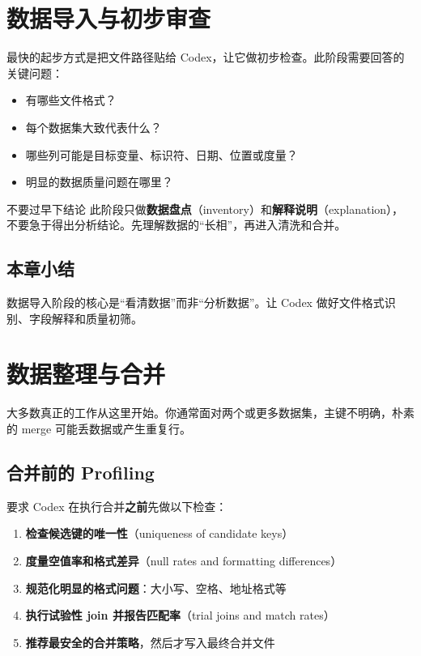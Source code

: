 \documentclass[a4paper]{article}
\begin{document}
\section{数据导入与初步审查}

最快的起步方式是把文件路径贴给 Codex，让它做初步检查。此阶段需要回答的关键问题：

\begin{itemize}[nosep]
    \item 有哪些文件格式？
    \item 每个数据集大致代表什么？
    \item 哪些列可能是目标变量、标识符、日期、位置或度量？
    \item 明显的数据质量问题在哪里？
\end{itemize}

\begin{warningbox}{不要过早下结论}
此阶段只做\textbf{数据盘点}（inventory）和\textbf{解释说明}（explanation），不要急于得出分析结论。先理解数据的``长相''，再进入清洗和合并。
\end{warningbox}

\subsection{本章小结}
数据导入阶段的核心是``看清数据''而非``分析数据''。让 Codex 做好文件格式识别、字段解释和质量初筛。

\section{数据整理与合并}

大多数真正的工作从这里开始。你通常面对两个或更多数据集，主键不明确，朴素的 merge 可能丢数据或产生重复行。

\subsection{合并前的 Profiling}

要求 Codex 在执行合并\textbf{之前}先做以下检查：

\begin{enumerate}[nosep]
    \item \textbf{检查候选键的唯一性}（uniqueness of candidate keys）
    \item \textbf{度量空值率和格式差异}（null rates and formatting differences）
    \item \textbf{规范化明显的格式问题}：大小写、空格、地址格式等
    \item \textbf{执行试验性 join 并报告匹配率}（trial joins and match rates）
    \item \textbf{推荐最安全的合并策略}，然后才写入最终合并文件
\end{enumerate}
\end{document}
